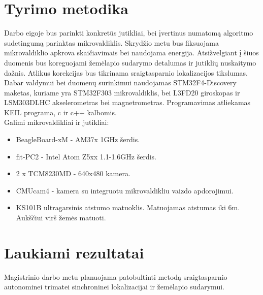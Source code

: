\documentclass[12pt, a4paper, lithuanian]{article}
\begin{document}
\begin{onehalfspacing}
\section{Tyrimo metodika}
Darbo eigoje bus parinkti konkret\=us jutikliai, bei \k{i}vertinus numatom\k{a} algoritmo sudetingum\k{a} parinktas mikrovaldiklis. Skryd\v{z}io metu bus fiksuojama mikrovaldiklio apkrova skai\v{c}iavimais bei naudojama energija. Atsi\v{z}velgiant \k{i} \v{s}iuos duomenis bus koreguojami \v{z}em\.elapio sudarymo detalumas ir jutikli\k{u} nuskaitymo da\v{z}nis. Atlikus korekcijas bus tikrinama sraigtasparnio lokalizacijos tikslumas.
\\
\indent Dabar valdymui bei duomen\k{u} surinkimui naudojamas STM32F4-Discovery maketas, kuriame yra STM32F303 mikrovaldiklis, bei  L3FD20 giroskopas ir LSM303DLHC akselerometras bei magnetrometras. Programavimas atliekamas KEIL programa, c ir c++ kalbomis. 
\\
Galimi mikrovaldikliai ir jutikliai:
\begin{itemize}
\item BeagleBoard-xM - AM37x 1GHz \v{s}erdis.
\item fit-PC2 - Intel Atom Z5xx 1.1-1.6GHz \v{s}erdis.
\item 2 x TCM8230MD - 640x480 kamera.
\item CMUcam4 - kamera su integruotu mikrovaldikliu vaizdo apdorojimui.
\item KS101B ultragarsinis atstumo matuoklis. Matuojamas atstumas iki 6m. Auk\v{s}\v{c}iui vir\v{s} \v{z}em\.es matuoti.


\end{itemize} 

\section{Laukiami rezultatai}

Magistrinio darbo metu planuojama patobultinti metod\k{a} sraigtasparnio autonominei trimatei sinchroninei lokalizacijai ir \v{z}em\.elapio sudarymui. 


\end{onehalfspacing}






\end{document}

